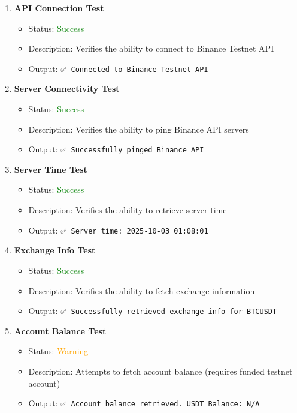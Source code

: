 \documentclass[12pt,a4paper]{article}
\begin{document}
\begin{enumerate}
    \item \textbf{API Connection Test}
    \begin{itemize}
        \item Status: \textcolor{green}{Success}
        \item Description: Verifies the ability to connect to Binance Testnet API
        \item Output: \texttt{✅ Connected to Binance Testnet API}
    \end{itemize}
    
    \item \textbf{Server Connectivity Test}
    \begin{itemize}
        \item Status: \textcolor{green}{Success}
        \item Description: Verifies the ability to ping Binance API servers
        \item Output: \texttt{✅ Successfully pinged Binance API}
    \end{itemize}
    
    \item \textbf{Server Time Test}
    \begin{itemize}
        \item Status: \textcolor{green}{Success}
        \item Description: Verifies the ability to retrieve server time
        \item Output: \texttt{✅ Server time: 2025-10-03 01:08:01}
    \end{itemize}
    
    \item \textbf{Exchange Info Test}
    \begin{itemize}
        \item Status: \textcolor{green}{Success}
        \item Description: Verifies the ability to fetch exchange information
        \item Output: \texttt{✅ Successfully retrieved exchange info for BTCUSDT}
    \end{itemize}
    
    \item \textbf{Account Balance Test}
    \begin{itemize}
        \item Status: \textcolor{orange}{Warning}
        \item Description: Attempts to fetch account balance (requires funded testnet account)
        \item Output: \texttt{✅ Account balance retrieved. USDT Balance: N/A}
    \end{itemize}
\end{enumerate}
\end{document}
